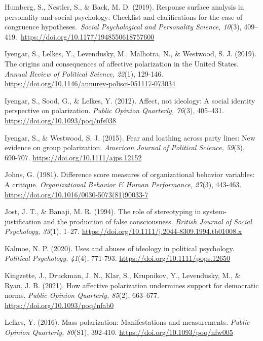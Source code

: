 \documentclass[authordate, meta, issue]{jote-new-article}
\begin{document}
	Humberg, S., Nestler, S., \& Back, M. D. (2019). Response surface analysis in personality and social psychology: Checklist and clarifications for the case of congruence hypotheses. \emph{Social Psychological and Personality Science, 10}(3), 409--419. \url{https://doi.org/10.1177/1948550618757600}



	Iyengar, S., Lelkes, Y., Levendusky, M., Malhotra, N., \& Westwood, S. J. (2019). The origins and consequences of affective polarization in the United States. \emph{Annual Review of Political Science, 22}(1), 129-146. \url{https://doi.org/10.1146/annurev-polisci-051117-073034}



	Iyengar, S., Sood, G., \& Lelkes, Y. (2012). Affect, not ideology: A social identity perspective on polarization. \emph{Public Opinion Quarterly, 76}(3), 405--431. \url{https://doi.org/10.1093/poq/nfs038}



	Iyengar, S., \& Westwood, S. J. (2015). Fear and loathing across party lines: New evidence on group polarization. \emph{American Journal of Political Science, 59}(3), 690-707. \url{https://doi.org/10.1111/ajps.12152}



	Johns, G. (1981). Difference score measures of organizational behavior variables: A critique. \emph{Organizational Behavior \& Human Performance, 27}(3), 443-463. \url{https://doi.org/10.1016/0030-5073(81)90033-7}



	Jost, J. T., \& Banaji, M. R. (1994). The role of stereotyping in system-justification and the production of false consciousness. \emph{British Journal of Social Psychology, 33}(1), 1--27. \url{https://doi.org/10.1111/j.2044-8309.1994.tb01008.x}



	Kalmoe, N. P. (2020). Uses and abuses of ideology in political psychology. \emph{Political Psychology, 41}(4), 771-793. \url{https://doi.org/10.1111/pops.12650}



	Kingzette, J., Druckman, J. N., Klar, S., Krupnikov, Y., Levendusky, M., \& Ryan, J. B. (2021). How affective polarization undermines support for democratic norms. \emph{Public Opinion Quarterly, 85}(2), 663--677. \url{https://doi.org/10.1093/poq/nfab0}



	Lelkes, Y. (2016). Mass polarization: Manifestations and measurements. \emph{Public Opinion Quarterly, 80}(S1), 392-410. \url{https://doi.org/10.1093/poq/nfw005}
\end{document}
